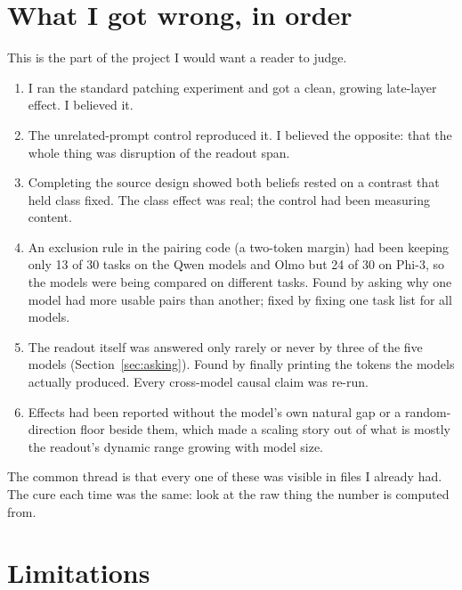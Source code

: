 \documentclass[10pt]{article}
\begin{document}
\section{What I got wrong, in order}\label{sec:process}

This is the part of the project I would want a reader to judge.
\begin{enumerate}[leftmargin=1.4em]
\item I ran the standard patching experiment and got a clean, growing
  late-layer effect. I believed it.
\item The unrelated-prompt control reproduced it. I believed the opposite:
  that the whole thing was disruption of the readout span.
\item Completing the source design showed both beliefs rested on a contrast
  that held class fixed. The class effect was real; the control had been
  measuring content.
\item An exclusion rule in the pairing code (a two-token margin) had been
  keeping only 13 of 30 tasks on the Qwen models and Olmo but 24 of 30 on
  Phi-3, so the models were being compared on different tasks. Found by
  asking why one model had more usable pairs than another; fixed by fixing
  one task list for all models.
\item The readout itself was answered only rarely or never by three of the
  five models (Section~\ref{sec:asking}). Found by finally printing the
  tokens the models actually produced. Every cross-model causal claim was
  re-run.
\item Effects had been reported without the model's own natural gap or a
  random-direction floor beside them, which made a scaling story out of what
  is mostly the readout's dynamic range growing with model size.
\end{enumerate}
The common thread is that every one of these was visible in files I already
had. The cure each time was the same: look at the raw thing the number is
computed from.

\section{Limitations}\label{sec:limits}
\end{document}
